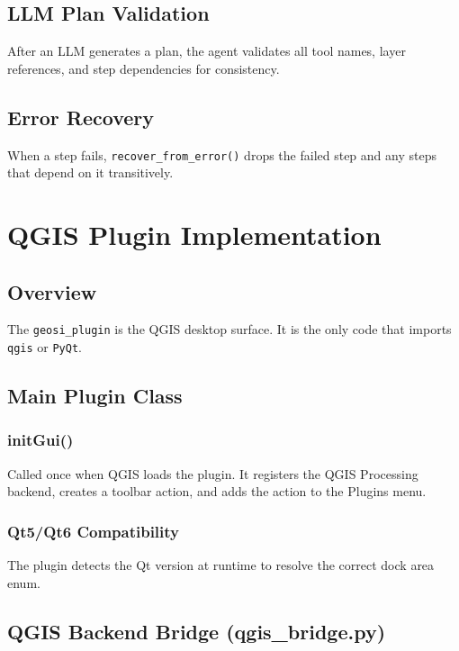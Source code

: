 \documentclass[12pt,a4paper]{report}
\begin{document}
\section{LLM Plan Validation}

After an LLM generates a plan, the agent validates all tool names, layer references, and step dependencies for consistency.

\section{Error Recovery}

When a step fails, \texttt{recover\_from\_error()} drops the failed step and any steps that depend on it transitively.

\chapter{QGIS Plugin Implementation}

\section{Overview}

The \texttt{geosi\_plugin} is the QGIS desktop surface. It is the only code that imports \texttt{qgis} or \texttt{PyQt}.

\section{Main Plugin Class}

\subsection{initGui()}

Called once when QGIS loads the plugin. It registers the QGIS Processing backend, creates a toolbar action, and adds the action to the Plugins menu.

\subsection{Qt5/Qt6 Compatibility}

The plugin detects the Qt version at runtime to resolve the correct dock area enum.

\section{QGIS Backend Bridge (qgis\_bridge.py)}
\end{document}

